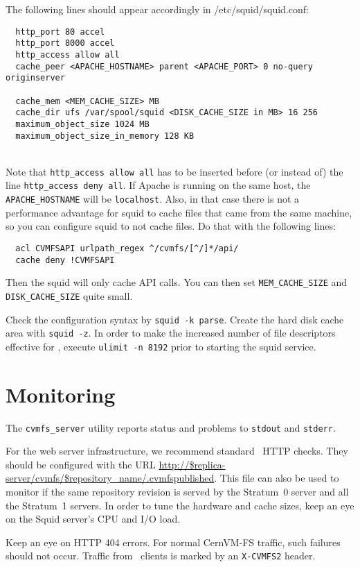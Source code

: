 The following lines should appear accordingly in /etc/squid/squid.conf:
\begin{verbatim}
  http_port 80 accel
  http_port 8000 accel
  http_access allow all
  cache_peer <APACHE_HOSTNAME> parent <APACHE_PORT> 0 no-query originserver

  cache_mem <MEM_CACHE_SIZE> MB
  cache_dir ufs /var/spool/squid <DISK_CACHE_SIZE in MB> 16 256
  maximum_object_size 1024 MB
  maximum_object_size_in_memory 128 KB
\end{verbatim}
\quad\\
Note that \texttt{http\_access allow all} has to be inserted before (or instead of) the line \texttt{http\_access deny all}.
If Apache is running on the same host, the \texttt{APACHE\_HOSTNAME}
will be \texttt{localhost}.  Also, in that case there is not a
performance advantage for squid to cache files that came from the same
machine, so you can configure squid to not cache files.  Do that with
the following lines:
\begin{verbatim}
  acl CVMFSAPI urlpath_regex ^/cvmfs/[^/]*/api/
  cache deny !CVMFSAPI
\end{verbatim}
Then the squid will only cache API calls.  You can then set
\texttt{MEM\_CACHE\_SIZE} and \texttt{DISK\_CACHE\_SIZE} quite small.

Check the configuration syntax by \texttt{squid -k parse}.
Create the hard disk cache area with \texttt{squid -z}. 
In order to make the increased number of file descriptors effective for \squid, execute \texttt{ulimit -n 8192} prior to starting the squid service.

\section{Monitoring}
The \texttt{cvmfs\_server} utility reports status and problems to \texttt{stdout} and \texttt{stderr}.

For the web server infrastructure, we recommend standard \nagios\ HTTP checks.
They should be configured with the URL \url{http://$replica-server/cvmfs/$repository_name/.cvmfspublished}.
This file can also be used to monitor if the same repository revision is served by the Stratum~0 server and all the Stratum~1 servers.
In order to tune the hardware and cache sizes, keep an eye on the Squid server's CPU and I/O load.

Keep an eye on HTTP 404 errors.
For normal CernVM-FS traffic, such failures should not occur.
Traffic from \cvmfs\ clients is marked by an \texttt{X-CVMFS2} header.
